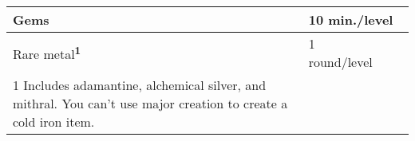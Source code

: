 \begin{longtable}{llll}
{\begin{minipage}[t]{2.069in}
Gems\end{minipage}} & \multicolumn{3}{p{1.139in}|}{\begin{minipage}[t]{1.139in}\raggedright
10 min./level\end{minipage}}\\
\hline
\multicolumn{1}{p{0.069in}|}{\begin{minipage}[t]{0.069in}\raggedright
Rare metal\textsuperscript{\textbf{1}}\end{minipage}} & \multicolumn{1}{p{0.069in}|}{\begin{minipage}[t]{0.069in}\raggedright
1 round/level\end{minipage}}\\
\hline
\multicolumn{1}{|p{2.069in}|}{\begin{minipage}[t]{2.069in}\raggedright
1 Includes adamantine, alchemical silver, and mithral. You can't use major creation 
to create a cold iron item.\end{minipage}}\\
\hline
\end{longtable}

